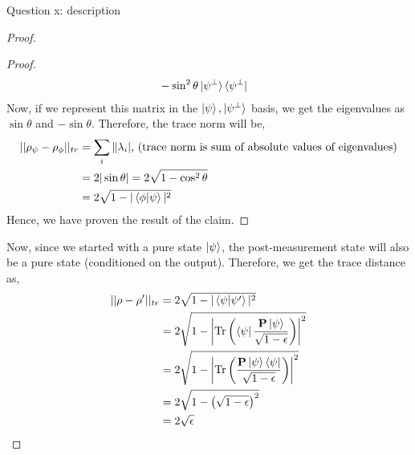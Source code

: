 \begin{solution}{Question x: description}
\begin{proof}
\begin{proof}
\begin{equation}
\begin{split}
                    &-\sin^2\theta\ket{\psi^\perp}\bra{\psi^\perp}
                \end{split}
            \end{equation}
            Now, if we represent this matrix in the $\ket{\psi}, \ket{\psi^\perp}$ basis, we get the eigenvalues as $\sin\theta$ and $-\sin\theta$. Therefore, the trace norm will be,
            \begin{equation}
                \begin{split}
                    ||\rho_{\psi} - \rho_{\phi}||_{tr} &= \sum_i\|\lambda_i|\text{, (trace norm is sum of absolute values of eigenvalues)}\\
                    &= 2|\sin\theta| = 2\sqrt{1 - \cos^2\theta}\\
                    &= 2\sqrt{1 - |\braket{\phi|\psi}|^2}
                \end{split}
            \end{equation}
            Hence, we have proven the result of the claim.
        \end{proof}
        Now, since we started with a pure state $\ket{\psi}$, the post-measurement state will also be a pure state (conditioned on the output). Therefore, we get the trace distance as,
        \begin{equation}
            \begin{split}
                ||\rho - \rho'||_{tr} &= 2\sqrt{1 - |\braket{\psi|\psi'}|^2}\\
                &= 2\sqrt{1 - \left|\mathrm{Tr}\left( \bra{\psi}\frac{\mathbf{P}\ket{\psi}}{\sqrt{1-\epsilon}} \right)\right|^2}\\
                &= 2\sqrt{1 - \left|\mathrm{Tr}\left( \frac{\mathbf{P}\ket{\psi}\bra{\psi}}{\sqrt{1-\epsilon}} \right)\right|^2}\\
                &= 2\sqrt{1 - \left(\sqrt{1 - \epsilon}\right)^2}\\
                &= 2\sqrt{\epsilon}
            \end{split}
        \end{equation}
    \end{proof}
\end{solution}
